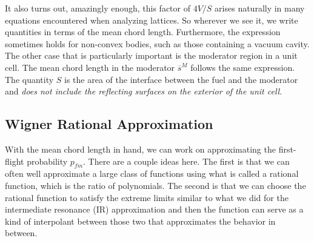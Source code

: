 It also turns out, amazingly enough, this factor of $4V/S$ arises naturally in many equations encountered when analyzing lattices. So wherever we see it, we write quantities in terms of the mean chord length. Furthermore, the expression sometimes holds for non-convex bodies, such as those containing a vacuum cavity. The other case that is particularly important is the moderator region in a unit cell. The mean chord length in the moderator $\overline{s}^M$ follows the same expression. The quantity $S$ is the area of the interface between the fuel and the moderator and \emph{does not include the reflecting surfaces on the exterior of the unit cell}.

\subsection{Wigner Rational Approximation}

With the mean chord length in hand, we can work on approximating the first-flight probability $p_{fm}$. There are a couple ideas here. The first is that we can often well approximate a large class of functions using what is called a rational function, which is the ratio of polynomials. The second is that we can choose the rational function to satisfy the extreme limits similar to what we did for the intermediate resonance (IR) approximation and then the function can serve as a kind of interpolant between those two that approximates the behavior in between.

